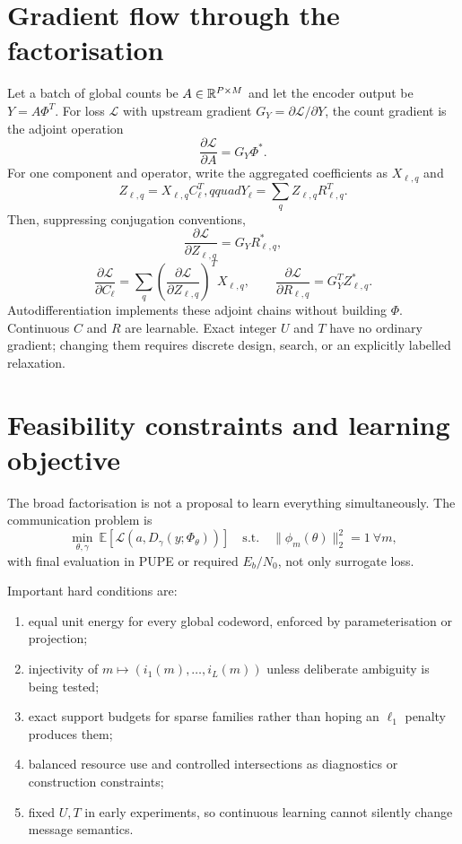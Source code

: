 \documentclass[11pt]{article}
\begin{document}
\section{Gradient flow through the factorisation}

Let a batch of global counts be $A\in\mathbb{R}^{P\times M}$ and let the encoder output be $Y=A\Phi^T$. For loss $\mathcal L$
with upstream gradient $G_Y=\partial\mathcal L/\partial Y$, the count gradient is the adjoint operation
\[
 \frac{\partial\mathcal L}{\partial A}=G_Y\Phi^*.
\]
For one component and operator, write the aggregated coefficients as $X_{\ell,q}$ and
\[
 Z_{\ell,q}=X_{\ell,q}C_\ell^T,qquad
 Y_\ell=\sum_q Z_{\ell,q}R_{\ell,q}^T.
\]
Then, suppressing conjugation conventions,
\[
 \frac{\partial\mathcal L}{\partial Z_{\ell,q}}=G_YR_{\ell,q}^*,
\]
\[
 \frac{\partial\mathcal L}{\partial C_\ell}
 =\sum_q\left(\frac{\partial\mathcal L}{\partial Z_{\ell,q}}\right)^TX_{\ell,q},
 \qquad
 \frac{\partial\mathcal L}{\partial R_{\ell,q}}
 =G_Y^TZ_{\ell,q}^*.
\]
Autodifferentiation implements these adjoint chains without building $\Phi$. Continuous $C$ and $R$ are learnable.
Exact integer $U$ and $T$ have no ordinary gradient; changing them requires discrete design, search, or an explicitly
labelled relaxation.

\section{Feasibility constraints and learning objective}

The broad factorisation is not a proposal to learn everything simultaneously. The communication problem is
\[
 \min_{\theta,\gamma}\ \mathbb E[\mathcal L(a,D_\gamma(y;\Phi_\theta))]
 \quad\text{s.t.}\quad \|\phi_m(\theta)\|_2^2=1\ \forall m,
\]
with final evaluation in PUPE or required $E_b/N_0$, not only surrogate loss.

Important hard conditions are:
\begin{enumerate}
 \item equal unit energy for every global codeword, enforced by parameterisation or projection;
 \item injectivity of $m\mapsto(i_1(m),\ldots,i_L(m))$ unless deliberate ambiguity is being tested;
 \item exact support budgets for sparse families rather than hoping an $\ell_1$ penalty produces them;
 \item balanced resource use and controlled intersections as diagnostics or construction constraints;
 \item fixed $U,T$ in early experiments, so continuous learning cannot silently change message semantics.
\end{enumerate}
\end{document}
